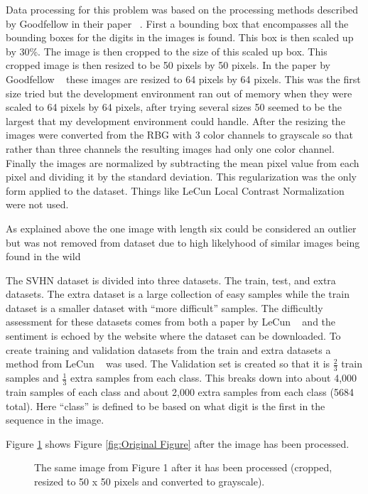 \documentclass[12pt,twocolumn,letterpaper]{article}
\begin{document}
Data processing for this problem was based on the processing methods described
by Goodfellow \etal in their paper ~\cite{goodfellow}. First a bounding box that encompasses 
all the bounding boxes for the digits in the images is found. This box is then 
scaled up by 30\%. The image is then cropped to the size of this scaled up box.
This cropped image is then resized to be 50 pixels by 50 pixels. In the paper
by Goodfellow \etal ~\cite{goodfellow} these images are resized to 64 pixels by 64 pixels. This
was the first size tried but the development environment ran out of memory
when they were scaled to 64 pixels by 64 pixels, after trying several sizes 50
seemed to be the largest that my development environment could handle. After the 
resizing the images were converted from the RBG with 3 color channels to grayscale 
so that rather than three channels the resulting images had only one color channel. 
Finally the images are normalized by subtracting the mean pixel value from each 
pixel and dividing it by the standard deviation. This regularization was the 
only form applied to the dataset. Things like LeCun Local Contrast Normalization 
were not used.

As explained above the one image with length six could be considered an outlier 
but was not removed from dataset due to high likelyhood of similar images being 
found in the wild 

The SVHN dataset is divided into three datasets. The train, test, and extra datasets.
The extra dataset is a large collection of easy samples while the train dataset is 
a smaller dataset with ``more difficult'' samples. The difficultly assessment for 
these datasets comes from both a paper by LeCun \etal ~\cite{sermanet-icpr-12} and 
the sentiment is echoed by the website where the dataset can be downloaded. To create 
training and validation datasets from the train and extra datasets a method from LeCun \etal ~\cite{sermanet-icpr-12}
was used. The Validation set is created so that it is $\frac{2}{3}$ train samples 
and $\frac{1}{3}$ extra samples from each class. This breaks down into about 4,000 
train samples of each class and about 2,000 extra samples from each class 
(5684 total). Here ``class'' is defined to be based on what digit is the first 
in the sequence in the image.

Figure \ref{fig:Processed Figure} shows Figure \ref{fig:Original Figure} after the image has been processed.

\begin{figure}[t]
\begin{center}
\end{center}
   \caption{The same image from Figure 1 after it has been processed (cropped, 
   			resized to 50 x 50 pixels and converted to grayscale). }
\label{fig:Processed Figure}
\end{figure}
\end{document}
